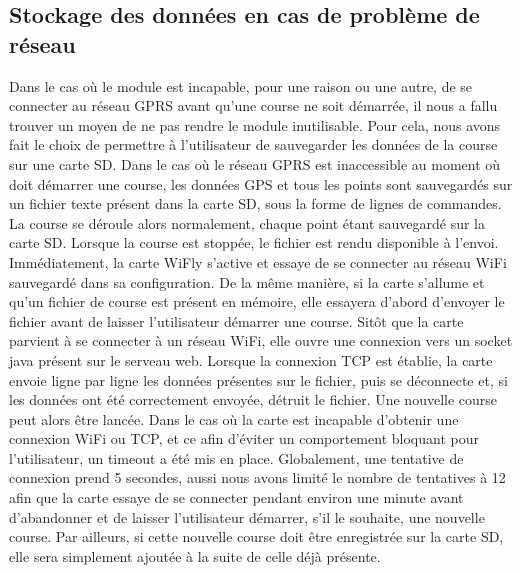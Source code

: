 \documentclass[a4paper,11pt]{article}
\begin{document}
\subsection{Stockage des données en cas de problème de réseau}
Dans le cas où le module est incapable, pour une raison ou une autre, de se connecter au réseau GPRS avant qu'une course ne soit démarrée, il nous a fallu trouver un moyen de ne pas rendre le module inutilisable. Pour cela, nous avons fait le choix de permettre à l'utilisateur de sauvegarder les données de la course sur une carte SD.\newline
Dans le cas où le réseau GPRS est inaccessible au moment où doit démarrer une course, les données GPS et tous les points sont sauvegardés sur un fichier texte présent dans la carte SD, sous la forme de lignes de commandes. La course se déroule alors normalement, chaque point étant sauvegardé sur la carte SD.\newline
Lorsque la course est stoppée, le fichier est rendu disponible à l'envoi. Immédiatement, la carte WiFly s'active et essaye de se connecter au réseau WiFi sauvegardé dans sa configuration. De la même manière, si la carte s'allume et qu'un fichier de course est présent en mémoire, elle essayera d'abord d'envoyer le fichier avant de laisser l'utilisateur démarrer une course.\newline
Sitôt que la carte parvient à se connecter à un réseau WiFi, elle ouvre une connexion vers un socket java présent sur le serveau web. Lorsque la connexion TCP est établie, la carte envoie ligne par ligne les données présentes sur le fichier, puis se déconnecte et, si les données ont été correctement envoyée, détruit le fichier. Une nouvelle course peut alors être lancée.\newline
Dans le cas où la carte est incapable d'obtenir une connexion WiFi ou TCP, et ce afin d'éviter un comportement bloquant pour l'utilisateur, un timeout a été mis en place. Globalement, une tentative de connexion prend 5 secondes, aussi nous avons limité le nombre de tentatives à 12 afin que la carte essaye de se connecter pendant environ une minute avant d'abandonner et de laisser l'utilisateur démarrer, s'il le souhaite, une nouvelle course. Par ailleurs, si cette nouvelle course doit être enregistrée sur la carte SD, elle sera simplement ajoutée à la suite de celle déjà présente.\newline
\end{document}
